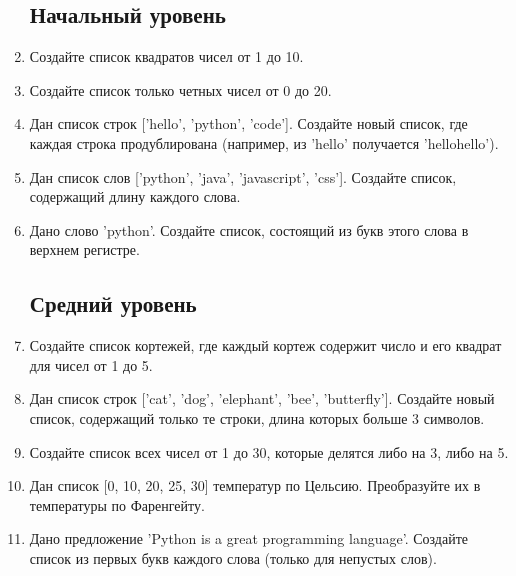 \documentclass[a4,12pt]{article}
\theoremstyle{remark}
\begin{document}
\begin{enumerate}
    \subsection*{Начальный уровень}
    \item Создайте список квадратов чисел от 1 до 10.
    \item Создайте список только четных чисел от 0 до 20.
    \item Дан список строк ['hello', 'python', 'code']. Создайте новый список, где каждая строка продублирована (например, из 'hello' получается 'hellohello').
    \item Дан список слов ['python', 'java', 'javascript', 'css']. Создайте список, содержащий длину каждого слова.
    \item Дано слово 'python'. Создайте список, состоящий из букв этого слова в верхнем регистре.
    
    \subsection*{Средний уровень}
    \item Создайте список кортежей, где каждый кортеж содержит число и его квадрат для чисел от 1 до 5.
    \item Дан список строк ['cat', 'dog', 'elephant', 'bee', 'butterfly']. Создайте новый список, содержащий только те строки, длина которых больше 3 символов.
    \item Создайте список всех чисел от 1 до 30, которые делятся либо на 3, либо на 5.
    \item Дан список [0, 10, 20, 25, 30] температур по Цельсию. Преобразуйте их в температуры по Фаренгейту.
    \item Дано предложение 'Python is a great programming language'. Создайте список из первых букв каждого слова (только для непустых слов).


\end{enumerate}
\end{document}
